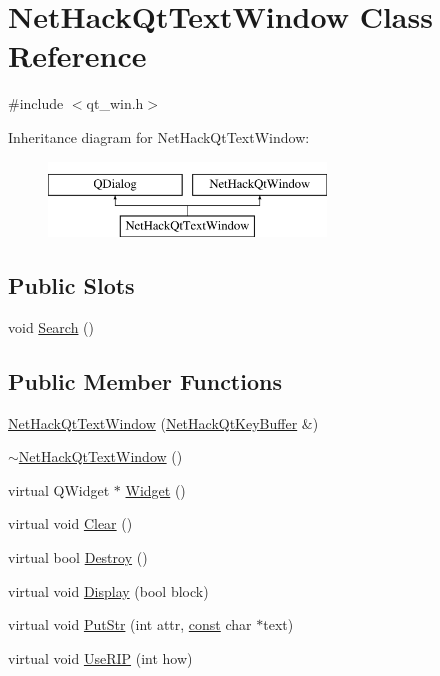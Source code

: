 \hypertarget{classNetHackQtTextWindow}{\section{Net\+Hack\+Qt\+Text\+Window Class Reference}
\label{classNetHackQtTextWindow}
}


{\ttfamily \#include $<$qt\+\_\+win.\+h$>$}

Inheritance diagram for Net\+Hack\+Qt\+Text\+Window\+:\begin{figure}[H]
\begin{center}
\leavevmode
\includegraphics[height=2.000000cm]{classNetHackQtTextWindow}
\end{center}
\end{figure}
\subsection*{Public Slots}
\begin{DoxyCompactItemize}
\item 
void \hyperlink{classNetHackQtTextWindow_aba077156cda3bcaf4fb6024f5b360294}{Search} ()
\end{DoxyCompactItemize}
\subsection*{Public Member Functions}
\begin{DoxyCompactItemize}
\item 
\hyperlink{classNetHackQtTextWindow_a8193f63d5e40a6347602db94fd98f6bf}{Net\+Hack\+Qt\+Text\+Window} (\hyperlink{classNetHackQtKeyBuffer}{Net\+Hack\+Qt\+Key\+Buffer} \&)
\item 
\hyperlink{classNetHackQtTextWindow_a93f5c1ec6ef37d9f984afd259fcf6134}{$\sim$\+Net\+Hack\+Qt\+Text\+Window} ()
\item 
virtual Q\+Widget $\ast$ \hyperlink{classNetHackQtTextWindow_ac82fdaf9ba18910511616ef7f6f66147}{Widget} ()
\item 
virtual void \hyperlink{classNetHackQtTextWindow_a83d6cd189cecd2b3cdef4a3b9856a092}{Clear} ()
\item 
virtual bool \hyperlink{classNetHackQtTextWindow_aee122a36814a919a5637601a071f8a2c}{Destroy} ()
\item 
virtual void \hyperlink{classNetHackQtTextWindow_a2a2f8b0feb829be7f16e6026fb9a5d1e}{Display} (bool block)
\item 
virtual void \hyperlink{classNetHackQtTextWindow_ad443a84e689d6063aa72f868a07fac6e}{Put\+Str} (int attr, \hyperlink{tradstdc_8h_a2c212835823e3c54a8ab6d95c652660e}{const} char $\ast$text)
\item 
virtual void \hyperlink{classNetHackQtTextWindow_a99db5882fbfc07388cb1f42e8c34efa1}{Use\+R\+I\+P} (int how)
\end{DoxyCompactItemize}
